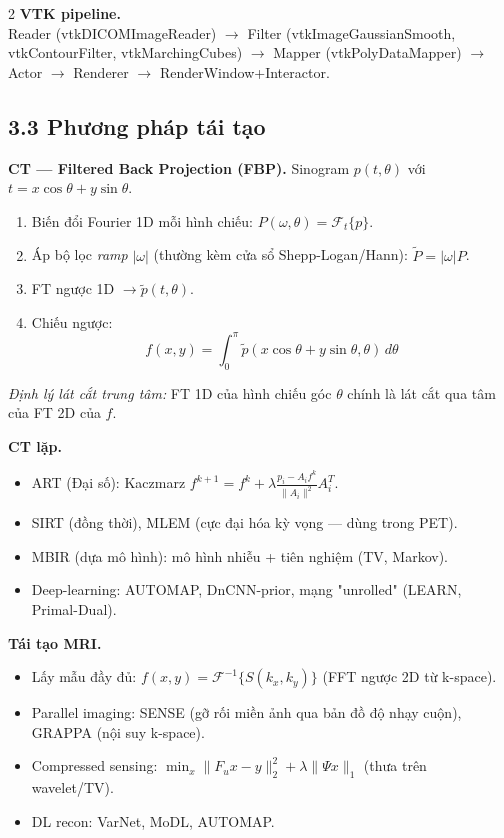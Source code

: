 \begin{paracol}{2}
\textbf{VTK pipeline.}\\
{\scriptsize\ttfamily Reader (vtkDICOMImageReader) $\to$ Filter (vtkImageGaussianSmooth, vtkContourFilter, vtkMarchingCubes) $\to$ Mapper (vtkPolyDataMapper) $\to$ Actor $\to$ Renderer $\to$ RenderWindow+Interactor.}

\switchcolumn

\subsection*{3.3 Phương pháp tái tạo}
\textbf{CT — Filtered Back Projection (FBP).}
Sinogram $p(t,\theta)$ với $t=x\cos\theta+y\sin\theta$.
\begin{enumerate}[leftmargin=*,nosep]
  \item Biến đổi Fourier 1D mỗi hình chiếu: $P(\omega,\theta)=\mathcal F_t\{p\}$.
  \item Áp bộ lọc \emph{ramp} $|\omega|$ (thường kèm cửa sổ Shepp-Logan/Hann): $\tilde P=|\omega|P$.
  \item FT ngược 1D $\to \tilde p(t,\theta)$.
  \item Chiếu ngược:
  $$f(x,y)=\int_0^\pi \tilde p(x\cos\theta + y\sin\theta,\theta)\,d\theta$$
\end{enumerate}
\emph{Định lý lát cắt trung tâm:} FT 1D của hình chiếu góc $\theta$ chính là lát cắt qua tâm của FT 2D của $f$.

\textbf{CT lặp.}
\begin{itemize}[leftmargin=*,nosep]
  \item ART (Đại số): Kaczmarz $f^{k+1}=f^k+\lambda \frac{p_i-A_i f^k}{\|A_i\|^2}A_i^T$.
  \item SIRT (đồng thời), MLEM (cực đại hóa kỳ vọng — dùng trong PET).
  \item MBIR (dựa mô hình): mô hình nhiễu + tiên nghiệm (TV, Markov).
  \item Deep-learning: AUTOMAP, DnCNN-prior, mạng "unrolled" (LEARN, Primal-Dual).
\end{itemize}

\textbf{Tái tạo MRI.}
\begin{itemize}[leftmargin=*,nosep]
  \item Lấy mẫu đầy đủ: $f(x,y)=\mathcal F^{-1}\{S(k_x,k_y)\}$ (FFT ngược 2D từ k-space).
  \item Parallel imaging: SENSE (gỡ rối miền ảnh qua bản đồ độ nhạy cuộn), GRAPPA (nội suy k-space).
  \item Compressed sensing: $\min_x \|F_u x-y\|_2^2 + \lambda\|\Psi x\|_1$ (thưa trên wavelet/TV).
  \item DL recon: VarNet, MoDL, AUTOMAP.
\end{itemize}


\end{paracol}

